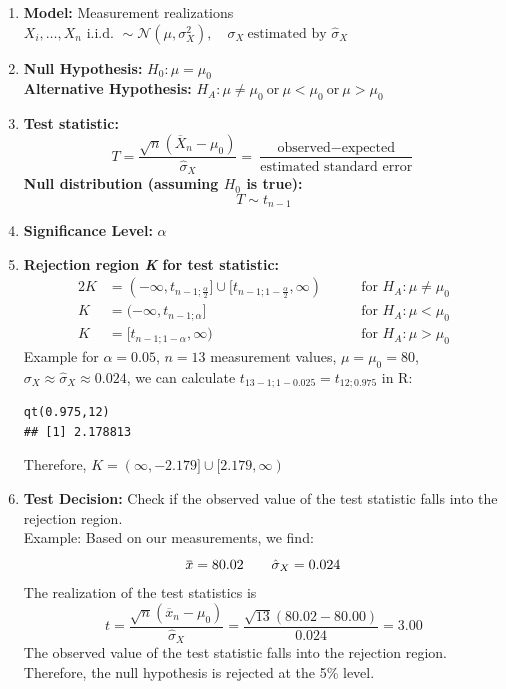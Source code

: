 \documentclass[11pt]{article}
\newcommand*\samplemean[1]{\overline{#1}}
\newcommand*\N[1]{\mathcal{N}\left(#1\right)}
\newcommand{\overbar}[1]{\mkern 1.5mu\overline{\mkern-1.5mu#1\mkern-1.5mu}\mkern 1.5mu}
\begin{document}
\begin{enumerate}[label=\textbf{\arabic*})] %
	\item \textbf{Model:} Measurement realizations $ X_i, \dots, X_n \text{ i.i.d. } \sim \N{\mu, \sigma_X^2}, \quad \sigma_X\ \text{estimated by } \hat{\sigma}_X$
	\item \textbf{Null Hypothesis:} $H_0: \mu = \mu_0$\\ \textbf{Alternative Hypothesis:} $H_A: \mu \neq \mu_0\ \text{or}\ \mu < \mu_0\ \text{or}\ \mu > \mu_0$
	\item \textbf{Test statistic:}
	\begin{equation*}
		T = \frac{\sqrt{n}\left(\samplemean{X}_n - \mu_0\right)}{\hat{\sigma}_X} =\frac{\text{observed} - \text{expected}}{\text{estimated standard error}}
	\end{equation*}
	\textbf{Null distribution (assuming $H_0$ is true):}
	\begin{equation*}
		T \sim t_{n-1}
	\end{equation*}
	\item \textbf{Significance Level:} $\alpha$
	\item \textbf{Rejection region \textit{K} for test statistic:}
	\begin{alignat*}{2}
		K &= (-\infty,t_{n-1;\frac{\alpha}{2}}] \cup [t_{n-1;1-\frac{\alpha}{2}}, \infty) &\qquad \text{for } H_A : \mu\neq \mu_0\\
		K &= (-\infty, t_{n-1;\alpha}] &\qquad \text{for } H_A : \mu < \mu_0\\
		K &= [ t_{n-1;1-\alpha}, \infty ) &\qquad \text{for } H_A : \mu > \mu_0
	\end{alignat*}
	Example for $\alpha = 0.05$, $n=13$ measurement values, $\mu=\mu_0=80$, $\sigma_X \approx \hat{\sigma}_X \approx 0.024$, we can calculate $t_{13-1;1-0.025}=t_{12;0.975}$ in R: 
\begin{verbatim}
qt(0.975,12)
## [1] 2.178813
\end{verbatim}
	Therefore, $K = (\infty, -2.179] \cup [2.179, \infty)$
	\item \textbf{Test Decision:} Check if the observed value of the test statistic falls into the rejection region.\\
	
	\noindent
	Example: Based on our measurements, we find: 
	\begin{equation*}
		\overbar{x} = 80.02 \qquad \hat{\sigma}_X = 0.024
	\end{equation*}
	The realization of the test statistics is 
	\begin{equation*}
	t = \frac{\sqrt{n}\left(\samplemean{x}_n - \mu_0\right)}{\hat{\sigma}_X} = \frac{\sqrt{13}(80.02-80.00)}{0.024}= 3.00
	\end{equation*}
	The observed value of the test statistic falls into the rejection region. Therefore, the null hypothesis is rejected at the 5\% level.
\end{enumerate}
\end{document}
